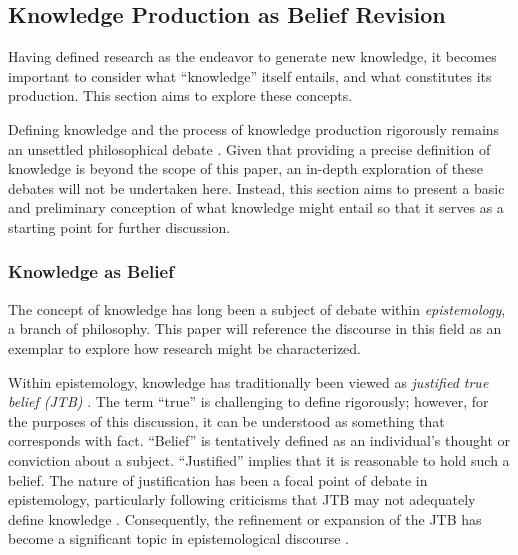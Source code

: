 \subsection{Knowledge Production as Belief Revision}
\label{section-knowledge-production-as-belief-revision}
Having defined research as the endeavor to generate new knowledge, it becomes important to consider what ``knowledge'' itself entails, and what constitutes its production. This section aims to explore these concepts.

Defining knowledge and the process of knowledge production rigorously remains an unsettled philosophical debate \cite{sep-epistemology}. Given that providing a precise definition of knowledge is beyond the scope of this paper, an in-depth exploration of these debates will not be undertaken here. Instead, this section aims to present a basic and preliminary conception of what knowledge might entail so that it serves as a starting point  for further discussion.



\subsubsection{Knowledge as Belief}
The concept of knowledge has long been a subject of debate within \textit{epistemology}, a branch of philosophy. This paper will reference the discourse in this field as an exemplar to explore how research might be characterized.

Within epistemology, knowledge has traditionally been viewed as \textit{justified true belief (JTB)} \cite{sep-epistemology}. The term ``true'' is challenging to define rigorously; however, for the purposes of this discussion, it can be understood as something that corresponds with fact. ``Belief'' is tentatively defined as an individual's thought or conviction about a subject. ``Justified'' implies that it is reasonable to hold such a belief. The nature of justification has been a focal point of debate in epistemology, particularly following criticisms that JTB may not adequately define knowledge \cite{gettier1963justified}. Consequently, the refinement or expansion of the JTB has become a significant topic in epistemological discourse \cite{sep-epistemology}.

